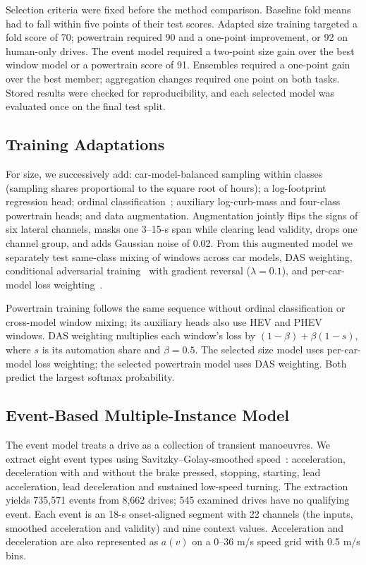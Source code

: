 Selection criteria were fixed before the method comparison. Baseline fold means had to fall within five points of their test scores. Adapted size training targeted a fold score of 70; powertrain required 90 and a one-point improvement, or 92 on human-only drives. The event model required a two-point size gain over the best window model or a powertrain score of 91. Ensembles required a one-point gain over the best member; aggregation changes required one point on both tasks. Stored results were checked for reproducibility, and each selected model was evaluated once on the final test split.

\subsection{Training Adaptations}
For size, we successively add: car-model-balanced sampling within classes (sampling shares proportional to the square root of hours); a log-footprint regression head; ordinal classification~\cite{cao2020coral}; auxiliary log-curb-mass and four-class powertrain heads; and data augmentation. Augmentation jointly flips the signs of six lateral channels, masks one 3--15-s span while clearing lead validity, drops one channel group, and adds Gaussian noise of 0.02. From this augmented model we separately test same-class mixing of windows across car models, DAS weighting, conditional adversarial training~\cite{ganin2016dann,long2018cdan} with gradient reversal ($\lambda=0.1$), and per-car-model loss weighting~\cite{sagawa2020dro}.

Powertrain training follows the same sequence without ordinal classification or cross-model window mixing; its auxiliary heads also use HEV and PHEV windows. DAS weighting multiplies each window's loss by $(1-\beta)+\beta(1-s)$, where $s$ is its automation share and $\beta=0.5$. The selected size model uses per-car-model loss weighting; the selected powertrain model uses DAS weighting. Both predict the largest softmax probability.

\subsection{Event-Based Multiple-Instance Model}
The event model treats a drive as a collection of transient manoeuvres. We extract eight event types using Savitzky--Golay-smoothed speed~\cite{savitzky1964}: acceleration, deceleration with and without the brake pressed, stopping, starting, lead acceleration, lead deceleration and sustained low-speed turning. The extraction yields 735,571 events from 8,662 drives; 545 examined drives have no qualifying event. Each event is an 18-s onset-aligned segment with 22 channels (the inputs, smoothed acceleration and validity) and nine context values. Acceleration and deceleration are also represented as $a(v)$ on a 0--36 m/s speed grid with 0.5 m/s bins.

